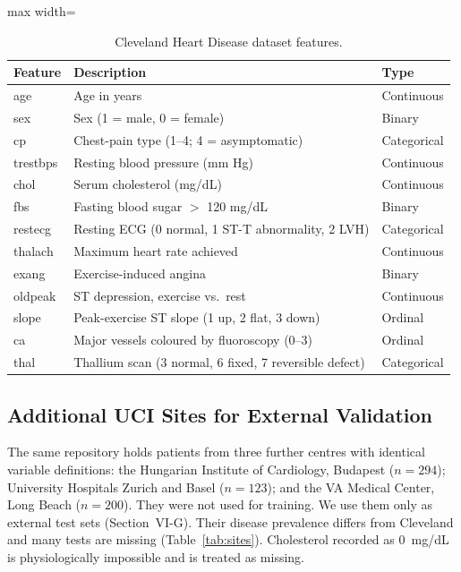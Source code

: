 \begin{table}[!t]
\centering\scriptsize
\caption{Cleveland Heart Disease dataset features.}
\label{tab:features}
\begin{adjustbox}{max width=\linewidth}
\begin{tabular}{lll}
\toprule
Feature & Description & Type\\
\midrule
age & Age in years & Continuous\\
sex & Sex (1 = male, 0 = female) & Binary\\
cp & Chest-pain type (1--4; 4 = asymptomatic) & Categorical\\
trestbps & Resting blood pressure (mm Hg) & Continuous\\
chol & Serum cholesterol (mg/dL) & Continuous\\
fbs & Fasting blood sugar $>$ 120 mg/dL & Binary\\
restecg & Resting ECG (0 normal, 1 ST-T abnormality, 2 LVH) & Categorical\\
thalach & Maximum heart rate achieved & Continuous\\
exang & Exercise-induced angina & Binary\\
oldpeak & ST depression, exercise vs.\ rest & Continuous\\
slope & Peak-exercise ST slope (1 up, 2 flat, 3 down) & Ordinal\\
ca & Major vessels coloured by fluoroscopy (0--3) & Ordinal\\
thal & Thallium scan (3 normal, 6 fixed, 7 reversible defect) & Categorical\\
\bottomrule
\end{tabular}
\end{adjustbox}
\end{table}



\subsection{Additional UCI Sites for External Validation}
The same repository holds patients from three further centres with identical variable definitions: the Hungarian Institute of Cardiology, Budapest ($n=294$); University Hospitals Zurich and Basel ($n=123$); and the VA Medical Center, Long Beach ($n=200$). They were not used for training. We use them only as external test sets (Section~VI-G). Their disease prevalence differs from Cleveland and many tests are missing (Table~\ref{tab:sites}). Cholesterol recorded as 0~mg/dL is physiologically impossible and is treated as missing.

